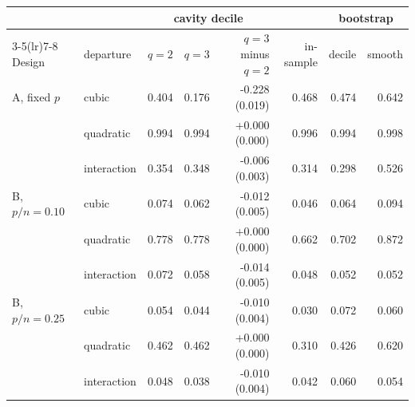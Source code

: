 \begin{tabular}{llrrrrrr}
\toprule
 & & \multicolumn{3}{c}{cavity decile} & & \multicolumn{2}{c}{bootstrap} \\
\cmidrule(lr){3-5}\cmidrule(lr){7-8}
Design & departure & $q=2$ & $q=3$ & $q=3$ minus $q=2$ & in-sample & decile & smooth \\
\midrule
A, fixed $p$ & cubic & 0.404 & 0.176 & -0.228 (0.019) & 0.468 & 0.474 & 0.642 \\
 & quadratic & 0.994 & 0.994 & +0.000 (0.000) & 0.996 & 0.994 & 0.998 \\
 & interaction & 0.354 & 0.348 & -0.006 (0.003) & 0.314 & 0.298 & 0.526 \\
B, $p/n = 0.10$ & cubic & 0.074 & 0.062 & -0.012 (0.005) & 0.046 & 0.064 & 0.094 \\
 & quadratic & 0.778 & 0.778 & +0.000 (0.000) & 0.662 & 0.702 & 0.872 \\
 & interaction & 0.072 & 0.058 & -0.014 (0.005) & 0.048 & 0.052 & 0.052 \\
B, $p/n = 0.25$ & cubic & 0.054 & 0.044 & -0.010 (0.004) & 0.030 & 0.072 & 0.060 \\
 & quadratic & 0.462 & 0.462 & +0.000 (0.000) & 0.310 & 0.426 & 0.620 \\
 & interaction & 0.048 & 0.038 & -0.010 (0.004) & 0.042 & 0.060 & 0.054 \\
\bottomrule
\end{tabular}
